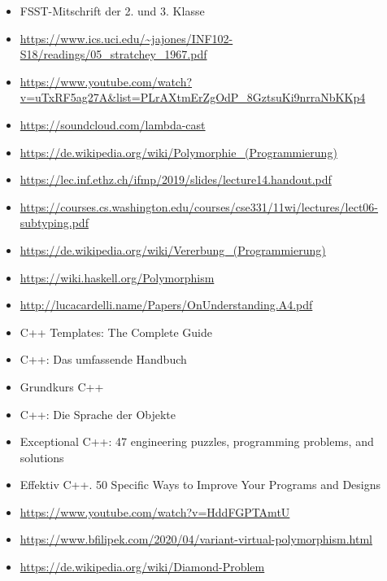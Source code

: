 \begin{itemize}
	\item FSST-Mitschrift der 2. und 3. Klasse
	\item \url{https://www.ics.uci.edu/~jajones/INF102-S18/readings/05_stratchey_1967.pdf}
	\item \url{https://www.youtube.com/watch?v=uTxRF5ag27A&list=PLrAXtmErZgOdP_8GztsuKi9nrraNbKKp4}
	\item \url{https://soundcloud.com/lambda-cast}
	\item \url{https://de.wikipedia.org/wiki/Polymorphie_(Programmierung)}
	\item \url{https://lec.inf.ethz.ch/ifmp/2019/slides/lecture14.handout.pdf}
	\item \url{https://courses.cs.washington.edu/courses/cse331/11wi/lectures/lect06-subtyping.pdf}
	\item \url{https://de.wikipedia.org/wiki/Vererbung_(Programmierung)}
	\item \url{https://wiki.haskell.org/Polymorphism}
	\item \url{http://lucacardelli.name/Papers/OnUnderstanding.A4.pdf}
	\item C++ Templates: The Complete Guide
	\item C++: Das umfassende Handbuch
	\item Grundkurs C++
	\item C++: Die Sprache der Objekte
	\item Exceptional C++: 47 engineering puzzles, programming problems, and solutions
	\item Effektiv C++. 50 Specific Ways to Improve Your Programs and Designs
	\item \url{https://www.youtube.com/watch?v=HddFGPTAmtU}
	\item \url{https://www.bfilipek.com/2020/04/variant-virtual-polymorphism.html}
	\item \url{https://de.wikipedia.org/wiki/Diamond-Problem}
\end{itemize}
